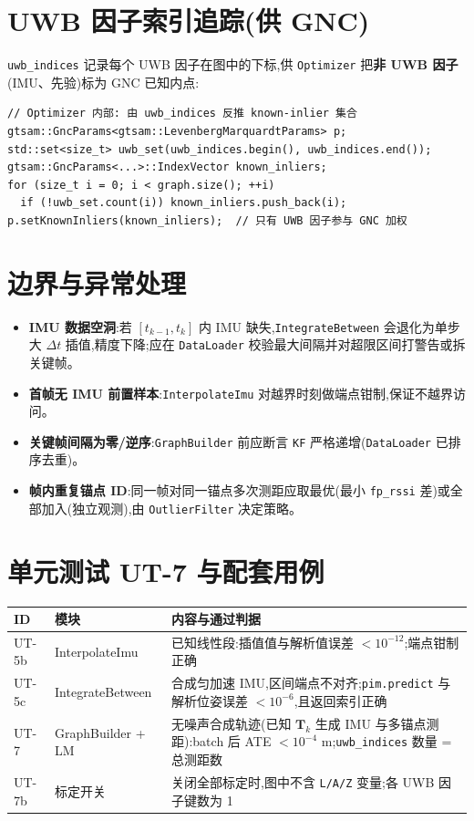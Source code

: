 \documentclass[11pt,a4paper]{report}
\newcommand{\bT}{\bm{T}}
\begin{document}
\section{UWB 因子索引追踪(供 GNC)}
\texttt{uwb\_indices} 记录每个 UWB 因子在图中的下标,供 \texttt{Optimizer} 把\textbf{非 UWB 因子}(IMU、先验)标为 GNC 已知内点:
\begin{lstlisting}[style=cpp]
// Optimizer 内部: 由 uwb_indices 反推 known-inlier 集合
gtsam::GncParams<gtsam::LevenbergMarquardtParams> p;
std::set<size_t> uwb_set(uwb_indices.begin(), uwb_indices.end());
gtsam::GncParams<...>::IndexVector known_inliers;
for (size_t i = 0; i < graph.size(); ++i)
  if (!uwb_set.count(i)) known_inliers.push_back(i);
p.setKnownInliers(known_inliers);  // 只有 UWB 因子参与 GNC 加权
\end{lstlisting}

\section{边界与异常处理}
\begin{itemize}[leftmargin=2em]
  \item \textbf{IMU 数据空洞}:若 $[t_{k-1},t_k]$ 内 IMU 缺失,\texttt{IntegrateBetween} 会退化为单步大 $\Delta t$ 插值,精度下降;应在 \texttt{DataLoader} 校验最大间隔并对超限区间打警告或拆关键帧。
  \item \textbf{首帧无 IMU 前置样本}:\texttt{InterpolateImu} 对越界时刻做端点钳制,保证不越界访问。
  \item \textbf{关键帧间隔为零/逆序}:\texttt{GraphBuilder} 前应断言 \texttt{KF} 严格递增(\texttt{DataLoader} 已排序去重)。
  \item \textbf{帧内重复锚点 ID}:同一帧对同一锚点多次测距应取最优(最小 \texttt{fp\_rssi} 差)或全部加入(独立观测),由 \texttt{OutlierFilter} 决定策略。
\end{itemize}

\section{单元测试 UT-7 与配套用例}
\begin{longtable}{l p{4.4cm} p{6.0cm}}
\toprule
ID & 模块 & 内容与通过判据 \\
\midrule
UT-5b & InterpolateImu & 已知线性段:插值值与解析值误差 $<10^{-12}$;端点钳制正确 \\
UT-5c & IntegrateBetween & 合成匀加速 IMU,区间端点不对齐;\texttt{pim.predict} 与解析位姿误差 $<10^{-6}$,且返回索引正确 \\
UT-7 & GraphBuilder + LM & 无噪声合成轨迹(已知 $\bT_k$ 生成 IMU 与多锚点测距):batch 后 ATE $<10^{-4}$ m;\texttt{uwb\_indices} 数量 = 总测距数 \\
UT-7b & 标定开关 & 关闭全部标定时,图中不含 \texttt{L/A/Z} 变量;各 UWB 因子键数为 1 \\
\bottomrule
\end{longtable}
\end{document}
